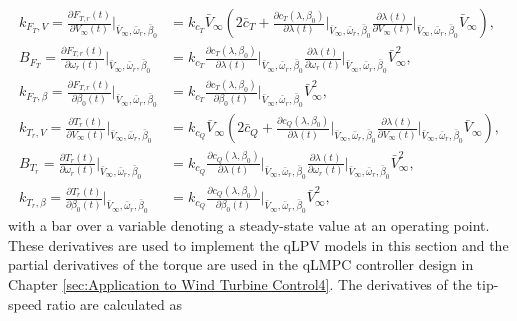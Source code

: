 \begin{align*}
    k_{F_T,V} = \frac{\partial F_{T,r}(t)}{\partial{V_{\infty}(t)}} \bigg|_{\bar{V}_{\infty},\bar{\omega}_r,\bar{\beta}_0} &= k_{c_T}  \bar{V}_{\infty} \left(2\bar{c}_T + \frac{\partial  c_T(\lambda,\beta_0)}{\partial{\lambda(t)}}\bigg|_{\bar{V}_{\infty},\bar{\omega}_r,\bar{\beta}_0}  \frac{ \partial \lambda(t)}{ \partial V_{\infty}(t)}\bigg|_{\bar{V}_{\infty},\bar{\omega}_r,\bar{\beta}_0} \bar{V}_{\infty} \right),\\
    B_{F_T} = \frac{\partial F_{T,r}(t)}{\partial{\omega_r(t) }}  \bigg|_{\bar{V}_{\infty},\bar{\omega}_r,\bar{\beta}_0} &= 
    k_{c_T} \frac{\partial c_{T}(\lambda,\beta_0)}{\partial \lambda(t)} \bigg|_{\bar{V}_{\infty},\bar{\omega}_r,\bar{\beta}_0} \frac{ \partial \lambda(t)}{ \partial \omega_r(t)}\bigg|_{\bar{V}_{\infty},\bar{\omega}_r,\bar{\beta}_0} \bar{V}_{\infty}^2, \\
    k_{F_T,\beta} = \frac{\partial F_{T,r}(t)}{\partial{\beta_0(t) }}  \bigg|_{\bar{V}_{\infty},\bar{\omega}_r,\bar{\beta}_0} &= 
    k_{c_T} \frac{\partial c_{T}(\lambda,\beta_0)}{\partial \beta_0(t)} \bigg|_{\bar{V}_{\infty},\bar{\omega}_r,\bar{\beta}_0} \bar{V}_{\infty}^2, \\
    k_{T_r,V} = \frac{\partial T_{r}(t)}{\partial{V_{\infty}(t)}} \bigg|_{\bar{V}_{\infty},\bar{\omega}_r,\bar{\beta}_0} &= k_{c_Q}  \bar{V}_{\infty} \left(2\bar{c}_Q + \frac{\partial  c_Q(\lambda,\beta_0)}{\partial{\lambda(t)}}\bigg|_{\bar{V}_{\infty},\bar{\omega}_r,\bar{\beta}_0}  \frac{ \partial \lambda(t)}{ \partial V_{\infty}(t)}\bigg|_{\bar{V}_{\infty},\bar{\omega}_r,\bar{\beta}_0} \bar{V}_{\infty} \right),\\
    B_{T_r} = \frac{\partial T_{r}(t)}{\partial{\omega_r(t) }}  \bigg|_{\bar{V}_{\infty},\bar{\omega}_r,\bar{\beta}_0} &= 
    k_{c_Q} \frac{\partial c_{Q}(\lambda,\beta_0)}{\partial \lambda(t)} \bigg|_{\bar{V}_{\infty},\bar{\omega}_r,\bar{\beta}_0} \frac{ \partial \lambda(t)}{ \partial \omega_r(t)}\bigg|_{\bar{V}_{\infty},\bar{\omega}_r,\bar{\beta}_0} \bar{V}_{\infty}^2, \\
    k_{T_r,\beta} = \frac{\partial T_{r}(t)}{\partial{\beta_0(t) }}  \bigg|_{\bar{V}_{\infty},\bar{\omega}_r,\bar{\beta}_0} &= 
    k_{c_Q} \frac{\partial c_{Q}(\lambda,\beta_0)}{\partial \beta_0(t)} \bigg|_{\bar{V}_{\infty},\bar{\omega}_r,\bar{\beta}_0} \bar{V}_{\infty}^2, 
\end{align*}
with a bar over a variable denoting a steady-state value at an operating point.
These derivatives are used to implement the qLPV models in this section and the partial derivatives of the torque are used in the qLMPC controller design in Chapter \ref{sec:Application to Wind Turbine Control4}. The derivatives of the tip-speed ratio are calculated as
